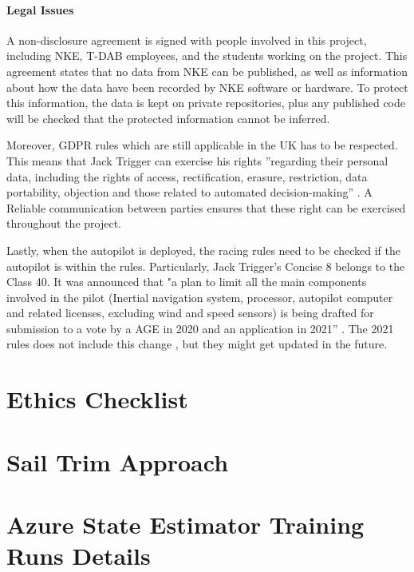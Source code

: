\documentclass[12pt,twoside]{report}
\begin{document}
\subsubsection{Legal Issues}
A non-disclosure agreement is signed with people involved in this project, including NKE, T-DAB employees, and the students working on the project. This agreement states that no data from NKE can be published, as well as information about how the data have been recorded by NKE software or hardware. To protect this information, the data is kept on private repositories, plus any published code will be checked that the protected information cannot be inferred.

Moreover, GDPR rules which are still applicable in the UK has to be respected. This means that Jack Trigger can exercise his rights ”regarding their personal data, including the rights of access, rectification, erasure, restriction, data portability, objection and those related to automated decision-making” \cite{ico-gdpr}. A Reliable communication between parties ensures that these right can be exercised throughout the project.

Lastly, when the autopilot is deployed, the racing rules need to be checked if the autopilot is within the rules. Particularly, Jack Trigger's Concise 8 belongs to the Class 40. It was announced that "a plan to limit all the main components involved in the pilot (Inertial navigation system, processor, autopilot computer and related licenses, excluding wind and speed sensors) is being drafted for submission to a vote by a AGE in 2020 and an application in 2021” \cite{class40}. The 2021 rules does not include this change \cite{class40-rules}, but they might get updated in the future.






\appendix
{}

\chapter{Ethics Checklist}
\label{app:ethics}


\chapter{Sail Trim Approach}


\chapter{Azure State Estimator Training Runs Details} 
\label{app:azure-runs}

\end{document}
